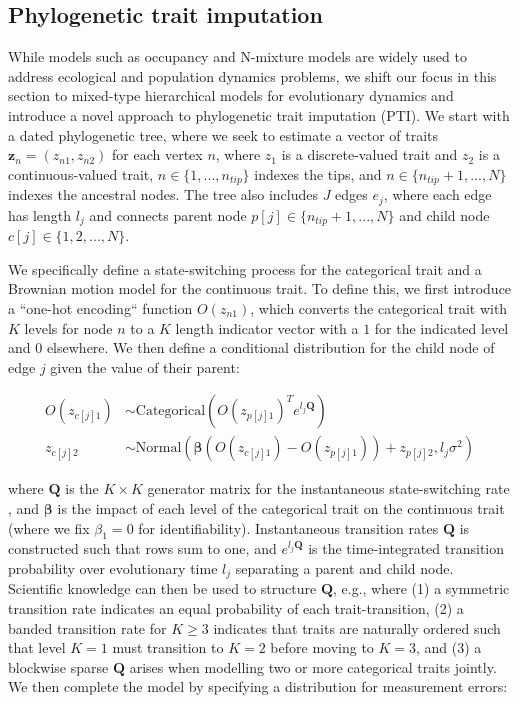 \documentclass[11pt]{article}
\newcommand{\vect}[1]{\bm{#1}}
\newcommand{\mat}[1]{\bm{#1}}
\begin{document}
\subsection{Phylogenetic trait imputation}
While models such as occupancy and N-mixture models are widely used to address ecological and population dynamics problems, we shift our focus in this section to mixed-type hierarchical models for evolutionary dynamics and introduce a novel approach to phylogenetic trait imputation (PTI).  We start with a dated phylogenetic tree, where we seek to estimate a vector of traits $\bm{z}_n =(z_{n1},z_{n2})$ for each vertex $n$, where $z_1$ is a discrete-valued trait and $z_2$ is a continuous-valued trait, $n\in \{1,...,n_{tip}\}$ indexes the tips, and $n\in \{ n_{tip}+1,...,N\}$ indexes the ancestral nodes.  The tree also includes $J$ edges $e_j$, where each edge has length $l_j$ and connects parent node $p[j] \in \{ n_{tip}+1,...,N\}$ and child node $c[j] \in \{ 1,2, ..., N \}$.   

We specifically define a state-switching process for the categorical trait and a Brownian motion model for the continuous trait.  To define this, we first introduce a ``one-hot encoding`` function $O(z_{n1})$, which converts the categorical trait with $K$ levels for node $n$ to a $K$ length indicator vector with a $1$ for the indicated level and $0$ elsewhere.  We then define a conditional distribution for the child node of edge $j$ given the value of their parent:

\begin{align}
    O(z_{c[j]1}) &\sim \mathrm{Categorical}\left( O(z_{p[j]1})^T e^{l_j\mat{Q}} \right) \\
    z_{c[j]2} &\sim \mathrm{Normal}\left( \vect{\beta} (O(z_{c[j]1}) - O(z_{p[j]1})) + z_{p[j]2} , l_j \sigma^2 \right)    
\end{align}

\noindent where $\mat{Q}$ is the $K \times K$ generator matrix for the instantaneous state-switching rate \citep{lewis_likelihood_2001}, and $\vect{\beta}$ is the impact of each level of the categorical trait on the continuous trait (where we fix $\beta_1=0$ for identifiability). Instantaneous transition rates $\mat{Q}$ is constructed such that rows sum to one, and $e^{l_j\mat{Q}}$ is the time-integrated transition probability over evolutionary time $l_j$ separating a parent and child node.  Scientific knowledge can then be used to structure $\mat{Q}$, e.g., where (1) a symmetric transition rate indicates an equal probability of each trait-transition, (2) a banded transition rate for $K \geq 3$ indicates that traits are naturally ordered such that level $K=1$ must transition to $K=2$ before moving to $K=3$, and (3) a blockwise sparse $\mat{Q}$ arises when modelling two or more categorical traits jointly.  We then complete the model by specifying a distribution for measurement errors:
\end{document}
